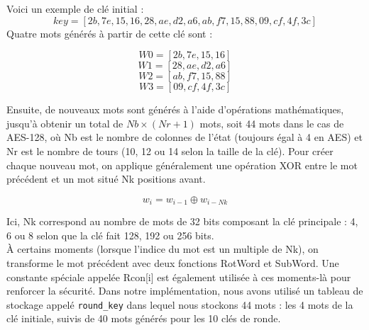 \documentclass[a4paper, 10pt]{article}
\begin{document}
  Voici un exemple de clé initial :\\
  \[ key = [2b, 7e, 15, 16, 28, ae, d2, a6, ab, f7, 15, 88, 09, cf, 4f, 3c]\]
  Quatre mots générés à partir de cette clé sont :

  \[ W0 = [2b, 7e, 15, 16]\]
  \[ W1 = [28, ae, d2, a6]\]
  \[ W2 = [ab, f7, 15, 88]\]
  \[ W3 = [09, cf, 4f, 3c]\]

  Ensuite, de nouveaux mots sont générés à l’aide d’opérations mathématiques, jusqu’à obtenir un total de $Nb \times (Nr + 1)$ mots, soit 44 mots dans le cas de AES-128, où Nb est le nombre de colonnes de l’état (toujours égal à 4 en AES) et Nr est le nombre de tours (10, 12 ou 14 selon la taille de la clé).
  Pour créer chaque nouveau mot, on applique généralement une opération XOR entre le mot précédent et un mot situé Nk positions avant.

  \[
    w_{i} =  w_{i - 1}\oplus  w_{i - Nk}
  \]

  Ici, Nk correspond au nombre de mots de 32 bits composant la clé principale : 4, 6 ou 8 selon que la clé fait 128, 192 ou 256 bits.\\
  À certains moments (lorsque l’indice du mot est un multiple de Nk), on transforme le mot précédent avec deux fonctions RotWord et SubWord.
  Une constante spéciale appelée Rcon[i] est également utilisée à ces moments-là pour renforcer la sécurité.
  Dans notre implémentation, nous avons utilisé un tableau de stockage appelé \texttt{round\_key} dans lequel nous stockons 44 mots : les 4 mots de la clé initiale, suivis de 40 mots générés pour les 10 clés de ronde.
  
\end{document}
